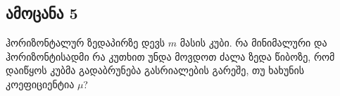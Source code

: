 \documentclass{article}
\begin{document}
\subsection{ამოცანა 5}
ჰორიზონტალურ ზედაპირზე დევს $m$ მასის კუბი. რა მინიმალური და ჰორიზონტისადმი რა კუთხით უნდა მოვდოთ ძალა ზედა წიბოზე, რომ დაიწყოს კუბმა გადაბრუნება გასრიალების გარეშე, თუ ხახუნის კოეფიციენტია $\mu$?
\end{document}
